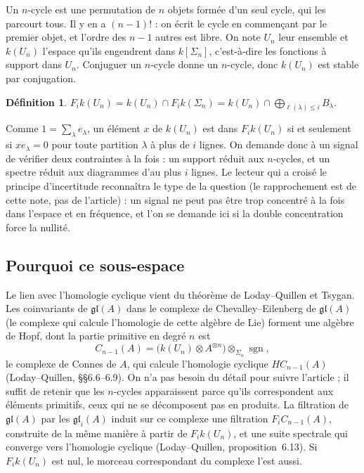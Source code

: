 \documentclass[11pt,a4paper]{amsart}
\theoremstyle{definition}
\newtheorem{definition}{Définition}
\theoremstyle{plain}
\theoremstyle{remark}
\newcommand{\gl}{\mathfrak{gl}}
\newcommand{\sgn}{\operatorname{sgn}}
\begin{document}
Un $n$-cycle est une permutation de $n$ objets formée d'un seul cycle, qui les parcourt tous. Il y en a $(n-1)!$ : on écrit le cycle en commençant par le premier objet, et l'ordre des $n-1$ autres est libre. On note $U_n$ leur ensemble et $k(U_n)$ l'espace qu'ils engendrent dans $k[\Sigma_n]$, c'est-à-dire les fonctions à support dans $U_n$. Conjuguer un $n$-cycle donne un $n$-cycle, donc $k(U_n)$ est stable par conjugation.

\begin{definition}
$F_i k(U_n) = k(U_n) \cap F_i k(\Sigma_n) = k(U_n) \cap \bigoplus_{\ell(\lambda) \le i} B_\lambda$.
\end{definition}

Comme $1 = \sum_\lambda e_\lambda$, un élément $x$ de $k(U_n)$ est dans $F_i k(U_n)$ si et seulement si $x e_\lambda = 0$ pour toute partition $\lambda$ à plus de $i$ lignes. On demande donc à un signal de vérifier deux contraintes à la fois : un support réduit aux $n$-cycles, et un spectre réduit aux diagrammes d'au plus $i$ lignes. Le lecteur qui a croisé le principe d'incertitude reconnaîtra le type de la question (le rapprochement est de cette note, pas de l'article) : un signal ne peut pas être trop concentré à la fois dans l'espace et en fréquence, et l'on se demande ici si la double concentration force la nullité.

\subsection{Pourquoi ce sous-espace}

Le lien avec l'homologie cyclique vient du théorème de Loday--Quillen et Tsygan. Les coinvariants de $\gl(A)$ dans le complexe de Chevalley--Eilenberg de $\gl(A)$ (le complexe qui calcule l'homologie de cette algèbre de Lie) forment une algèbre de Hopf, dont la partie primitive en degré $n$ est
\[
C_{n-1}(A) = \bigl(k(U_n) \otimes A^{\otimes n}\bigr) \otimes_{\Sigma_n} \sgn,
\]
le complexe de Connes de $A$, qui calcule l'homologie cyclique $HC_{n-1}(A)$ (Loday--Quillen, \S\S6.6--6.9). On n'a pas besoin du détail pour suivre l'article ; il suffit de retenir que les $n$-cycles apparaissent parce qu'ils correspondent aux éléments primitifs, ceux qui ne se décomposent pas en produits. La filtration de $\gl(A)$ par les $\gl_i(A)$ induit sur ce complexe une filtration $F_i C_{n-1}(A)$, construite de la même manière à partir de $F_i k(U_n)$, et une suite spectrale qui converge vers l'homologie cyclique (Loday--Quillen, proposition~6.13). Si $F_i k(U_n)$ est nul, le morceau correspondant du complexe l'est aussi.
\end{document}
